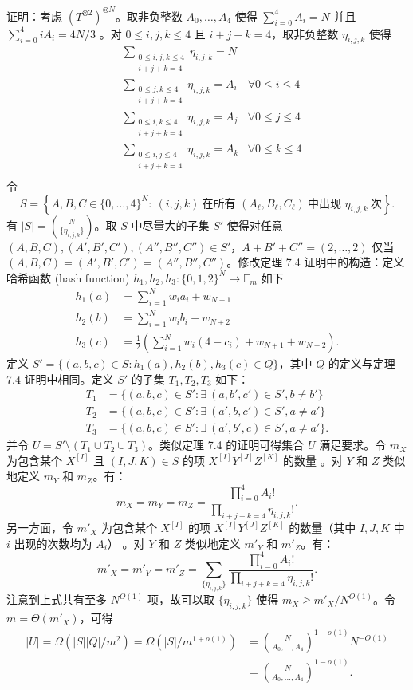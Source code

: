 \documentclass[11pt,fleqn, UTF8]{ctexbook} %
\begin{document}
证明：考虑 $\left(T^{\otimes 2}\right)^{\otimes N}$。取非负整数 $A_0,\dots,A_4$ 使得 $\sum_{i=0}^4 A_i=N$ 并且 $\sum_{i=0}^4 i A_i=4N/3$ 。对 $0\leq i,j,k\leq 4$ 且 $i+j+k=4$，取非负整数 $\eta_{i,j,k}$ 使得
\begin{align}
&\sum_{\substack{0\leq i,j,k\leq 4\\ i+j+k=4}} \eta_{i,j,k}=N\\
&\sum_{\substack{0\leq j,k\leq 4\\ i+j+k=4}} \eta_{i,j,k}=A_i & \forall 0\leq i\leq 4\\
&\sum_{\substack{0\leq i,k\leq 4\\ i+j+k=4}} \eta_{i,j,k}=A_j & \forall 0\leq j\leq 4\\
&\sum_{\substack{0\leq i,j\leq 4\\ i+j+k=4}} \eta_{i,j,k}=A_k & \forall 0\leq k\leq 4\\
\end{align}
令
$$
S=\left\{A,B,C\in \{0,\dots,4\}^N: ~(i,j,k) ~\text{在所有 }
(A_\ell,B_\ell,C_\ell) ~\text{中出现 } \eta_{i,j,k} ~\text{次} \right\}.
$$
有 $|S|={N\choose \{\eta_{i,j,k}\}}$。取 $S$ 中尽量大的子集 $S'$ 使得对任意 $(A,B,C),(A',B',C'),(A'',B'',C'')\in S'$，$A+B'+C''=(2,\dots,2)$ 仅当 $(A,B,C)=(A',B',C')=(A'',B'',C'')$。修改定理 7.4 证明中的构造：定义哈希函数 (hash function) $h_1,h_2,h_3:\{0,1,2\}^N\to\mathbb{F}_m$ 如下
\begin{align}
h_1(a)&=\sum_{i=1}^N w_i a_i+w_{N+1}\\
h_2(b)&=\sum_{i=1}^N w_i b_i+w_{N+2}\\
h_3(c)&=\frac{1}{2}\left( \sum_{i=1}^N w_i(4-c_i)+w_{N+1}+w_{N+2} \right).
\end{align}
定义 $S'=\{(a,b,c)\in S: h_1(a),h_2(b),h_3(c)\in Q\}$，其中 $Q$ 的定义与定理 7.4 证明中相同。定义 $S'$ 的子集 $T_1,T_2,T_3$ 如下：
\begin{align}
T_1&=\{(a,b,c)\in S': \exists~(a,b',c')\in S', b\neq b'\}\\
T_2&=\{(a,b,c)\in S': \exists~(a',b,c')\in S', a\neq a'\}\\
T_3&=\{(a,b,c)\in S': \exists~(a',b',c)\in S', a\neq a'\}.
\end{align}
并令 $U=S'\setminus (T_1\cup T_2\cup T_3)$。类似定理 7.4 的证明可得集合 $U$ 满足要求。令 $m_X$ 为包含某个 $X^{[I]}$ 且 $(I,J,K)\in S$ 的项 $X^{[I]}Y^{[J]}Z^{[K]}$ 的数量 。对 $Y$ 和 $Z$ 类似地定义 $m_Y$ 和 $m_Z$。有：
$$
m_X=m_Y=m_Z=\frac{\prod_{i=0}^4 A_i!}{\prod_{i+j+k=4}\eta_{i,j,k}!}.
$$
另一方面，令 $m'_X$ 为包含某个 $X^{[I]}$ 的项 $X^{[I]}Y^{[J]}Z^{[K]}$ 的数量（其中 $I,J,K$ 中 $i$ 出现的次数均为 $A_i$） 。对 $Y$ 和 $Z$ 类似地定义 $m'_Y$ 和 $m'_Z$。有：
$$
m'_X=m'_Y=m'_Z=\sum_{\{\eta_{i,j,k}\}}\frac{\prod_{i=0}^4 A_i!}{\prod_{i+j+k=4}\eta_{i,j,k}!}.
$$
注意到上式共有至多 $N^{O(1)}$ 项，故可以取 $\{\eta_{i,j,k}\}$ 使得 $m_X\geq m'_X/N^{O(1)}$。令 $m=\Theta(m'_X)$，可得
\begin{align}
|U|=\Omega(|S||Q|/m^2)=\Omega(|S|/m^{1+o(1)})&={N\choose A_0,\dots,A_4}^{1-o(1)}N^{-O(1)}\\&={N\choose A_0,\dots,A_4}^{1-o(1)}.
\end{align}
\end{document}
